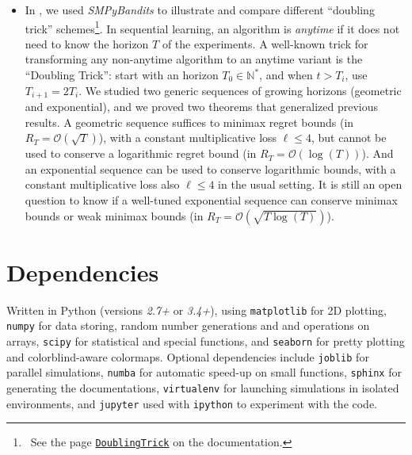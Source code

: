 \documentclass[a4paper,10pt,]{article}
\providecommand{\tightlist}{%
  \setlength{\itemsep}{0pt}\setlength{\parskip}{0pt}}
\begin{document}
\begin{itemize}
\tightlist
\item
  In \citet{Besson2018c}, we used \emph{SMPyBandits} to illustrate and
  compare different ``doubling trick'' schemes\footnote{~See the
    page
    \href{https://smpybandits.github.io/DoublingTrick.html}{\texttt{DoublingTrick}}
    on the documentation.}. In sequential learning, an algorithm is
  \emph{anytime} if it does not need to know the horizon \(T\) of the
  experiments. A well-known trick for transforming any non-anytime
  algorithm to an anytime variant is the ``Doubling Trick'': start with
  an horizon \(T_0\in\mathbb{N}^*\), and when \(t > T_i\), use
  \(T_{i+1} = 2 T_i\). We studied two generic sequences of growing
  horizons (geometric and exponential), and we proved two theorems that
  generalized previous results. A geometric sequence suffices to minimax
  regret bounds (in \(R_T = \mathcal{O}(\sqrt{T})\)), with a constant
  multiplicative loss \(\ell \leq 4\), but cannot be used to conserve a
  logarithmic regret bound (in \(R_T = \mathcal{O}(\log(T))\)). And an
  exponential sequence can be used to conserve logarithmic bounds, with
  a constant multiplicative loss also \(\ell \leq 4\) in the usual
  setting. It is still an open question to know if a well-tuned
  exponential sequence can conserve minimax bounds or weak minimax
  bounds (in \(R_T = \mathcal{O}(\sqrt{T \log(T)})\)).
\end{itemize}

\section{Dependencies}\label{dependencies}

Written in Python \citep{python} (versions \emph{2.7+} or \emph{3.4+}),
using \texttt{matplotlib} \citep{matplotlib} for 2D plotting,
\texttt{numpy} \citep{numpy} for data storing, random number generations
and and operations on arrays, \texttt{scipy} \citep{scipy} for
statistical and special functions, and \texttt{seaborn} \citep{seaborn}
for pretty plotting and colorblind-aware colormaps. Optional
dependencies include \texttt{joblib} \citep{joblib} for parallel
simulations, \texttt{numba} \citep{numba} for automatic speed-up on small
functions, \texttt{sphinx} \citep{sphinx} for generating the
documentations, \texttt{virtualenv} \citep{virtualenv} for launching
simulations in isolated environments, and \texttt{jupyter}
\citep{jupyter} used with \texttt{ipython} \citep{ipython} to experiment
with the code.


\end{document}
